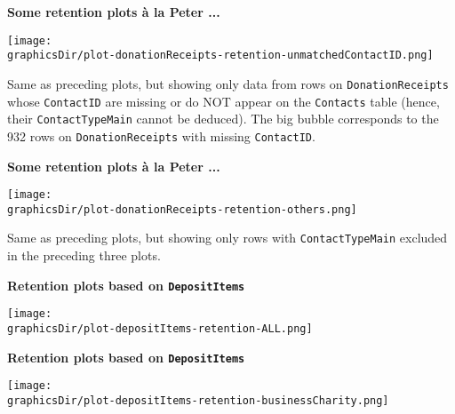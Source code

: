\begin{frame}{\bf Some retention plots \`{a} la Peter ...}
\tiny

\vskip 0.4cm

\begin{center}
\texttt{[image: \\graphicsDir/plot-donationReceipts-retention-unmatchedContactID.png]}
\end{center}

\begin{flushleft}
\vskip -0.2cm
Same as preceding plots, but showing only data from rows on \texttt{DonationReceipts}
whose \texttt{ContactID} are missing or do NOT appear on the \texttt{Contacts} table
(hence, their \texttt{ContactTypeMain} cannot be deduced).
The big bubble corresponds to the 932 rows on \texttt{DonationReceipts} with missing \texttt{ContactID}.
\end{flushleft}

\end{frame}

\begin{frame}{\bf Some retention plots \`{a} la Peter ...}
\tiny

\vskip 0.4cm

\begin{center}
\texttt{[image: \\graphicsDir/plot-donationReceipts-retention-others.png]}
\end{center}

\begin{flushleft}
\vskip -0.2cm
Same as preceding plots, but showing only rows with \texttt{ContactTypeMain} excluded in the preceding three plots.
\end{flushleft}

\end{frame}

\begin{frame}{\bf Retention plots based on \texttt{DepositItems}}
\tiny
\vskip 0.4cm
\begin{center}
\texttt{[image: \\graphicsDir/plot-depositItems-retention-ALL.png]}
\end{center}
\end{frame}

\begin{frame}{\bf Retention plots based on \texttt{DepositItems}}
\tiny
\vskip 0.4cm
\begin{center}
\texttt{[image: \\graphicsDir/plot-depositItems-retention-businessCharity.png]}
\end{center}
\end{frame}

